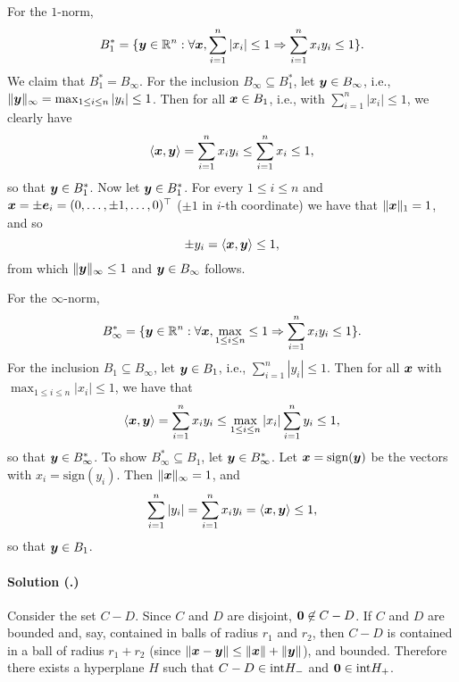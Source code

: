 \documentclass{article}
\newcounter{problemSheetNumber}
\newcounter{problems}
\renewcommand{\solution}[1]{\paragraph{Solution (\theproblemSheetNumber.\theproblems)}\addtocounter{problems}{1}\label{#1}}
\begin{document}
\begin{itemize}
For the $1$-norm, 
\begin{equation*}
 B_1^* = \{\bm{y}\in \mathbb{R}^n \mathrel{\mathop{:}} \forall \bm{x}, \sum_{i=1}^n |x_i|\leq 1\Rightarrow \sum_{i=1}^n x_i y_i\leq 1\}.
\end{equation*}
We claim that $B_1^*=B_{\infty}$. For the inclusion $B_\infty\subseteq B_1^*$, let $\bm{y}\in B_\infty$, i.e., $\Vert {\bm{y}}\Vert_\infty = \max_{1\leq i\leq n}|y_i|\leq 1$. Then for all $\bm{x}\in B_1$, i.e., with $\sum_{i=1}^n |x_i|\leq 1$, we clearly have 
\begin{equation*}
 \langle {\bm{x}}, {\bm{y}} \rangle = \sum_{i=1}^n x_iy_i\leq \sum_{i=1}^n x_i \leq 1,
\end{equation*}
so that $\bm{y}\in B_1^*$. Now let $\bm{y}\in B_1^*$. For every $1\leq i\leq n$ and $\bm{x}=\pm \bm{e}_i=(0,\dots,\pm 1,\dots,0)^{\top}$ ($\pm 1$ in $i$-th coordinate) we have that $\Vert {\bm{x}}\Vert_1=1$, and so 
\begin{equation*}
 \pm y_i = \langle {\bm{x}}, {\bm{y}} \rangle\leq 1, 
\end{equation*}
from which $\Vert {\bm{y}}\Vert_\infty\leq 1$ and $\bm{y}\in B_\infty$ follows.

For the $\infty$-norm,
\begin{equation*}
 B_\infty^* = \{\bm{y}\in \mathbb{R}^n \mathrel{\mathop{:}} \forall \bm{x}, \max_{1\leq i\leq n}\leq 1\Rightarrow \sum_{i=1}^n x_iy_i \leq 1\}.
\end{equation*}
For the inclusion $B_1\subseteq B_\infty$, let $\bm{y}\in B_1$, i.e., $\sum_{i=1}^n |y_i|\leq 1$. Then for all $\bm{x}$ with $\max_{1\leq i\leq n}|x_i|\leq 1$, we have that
\begin{equation*}
 \langle {\bm{x}}, {\bm{y}} \rangle = \sum_{i=1}^n x_iy_i\leq \max_{1\leq i\leq n}|x_i|\sum_{i=1}^n y_i \leq 1,
\end{equation*}
so that $\bm{y}\in B_\infty^*$. To show $B_\infty^*\subseteq B_1$, let $\bm{y}\in B_\infty^*$. Let $\bm{x}=\mathrm{sign}(\bm{y})$ be the vectors with $x_i = \mathrm{sign}(y_i)$. Then $\Vert {\bm{x}}\Vert_\infty = 1$, and
\begin{equation*}
 \sum_{i=1}^n |y_i| = \sum_{i=1}^n x_iy_i = \langle {\bm{x}}, {\bm{y}} \rangle \leq 1,
\end{equation*}
so that $\bm{y}\in B_1$.
\end{itemize}

\solution{pr:5} Consider the set $C-D$. Since $C$ and $D$ are disjoint, $\bm{0}\not\in C-D$. If $C$ and $D$ are bounded and, say, contained in balls of radius $r_1$ and $r_2$, then $C-D$ is contained in a ball of radius $r_1+r_2$ (since $\Vert {\bm{x}-\bm{y}}\Vert\leq \Vert {\bm{x}}\Vert+\Vert {\bm{y}}\Vert$), and bounded. Therefore there exists a hyperplane $H$ such that $C-D\in {\operatorname{int}} H_-$ and $\bm{0}\in {\operatorname{int}} H_+$.
\end{document}
